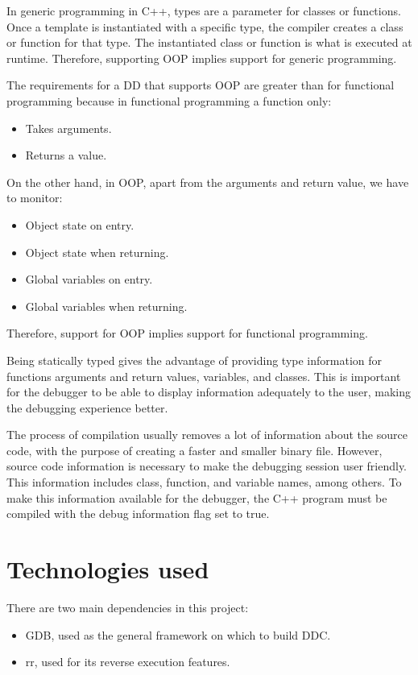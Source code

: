 In generic programming in C++, types are a parameter for classes or functions.
Once a template is instantiated with a specific type, the compiler creates a class or function for that type.
The instantiated class or function is what is executed at runtime. Therefore, supporting OOP implies support for generic programming.

The requirements for a DD that supports OOP are greater than for functional programming because in functional programming a function only:
\begin{itemize}
    \item Takes arguments.
    \item Returns a value.
\end{itemize}
On the other hand, in OOP, apart from the arguments and return value, we have to monitor:
\begin{itemize}
    \item Object state on entry.
    \item Object state when returning.
    \item Global variables on entry.
    \item Global variables when returning.
\end{itemize}
Therefore, support for OOP implies support for functional programming.

Being statically typed gives the advantage of providing type information for functions arguments and return values, variables, and classes. This is important for the debugger to be able to display information adequately to the user, making the debugging experience better.

The process of compilation usually removes a lot of information about the source code, with the purpose of creating a faster and smaller binary file.
However, source code information is necessary to make the debugging session user friendly. This information includes class, function, and variable names, among others.
To make this information available for the debugger, the C++ program must be compiled with the debug information flag set to true.

\section{Technologies used}
There are two main dependencies in this project:
\begin{itemize}
    \item GDB, used as the general framework on which to build DDC.
    \item rr, used for its reverse execution features.
\end{itemize}
